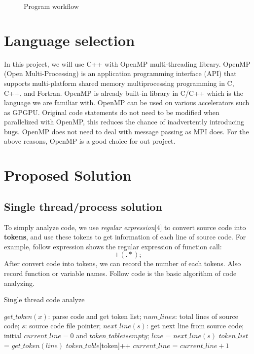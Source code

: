 \documentclass{acm_proc_article-sp}
\begin{document}
\begin{figure}
	\centering
	\caption{Program workflow}
\end{figure}

\section{Language selection}
	In this project, we will use C++ with OpenMP multi-threading library.
	OpenMP (Open Multi-Processing) is an application programming interface 
	(API) that supports multi-platform shared memory multiprocessing 
	programming in C, C++, and Fortran. OpenMP is already built-in library in 
	C/C++ which is the language we are familiar with. OpenMP can be used on 
	various accelerators such as GPGPU. Original code statements do not 
	need to be modified when parallelized with OpenMP, this reduces the chance 
	of inadvertently introducing bugs. OpenMP does not need to deal with message 
	passing as MPI does. For the above reasons, OpenMP is a good choice for 
	out project.
	
\section{Proposed Solution}
\subsection{Single thread/process solution}
	To simply analyze code, we use \textit{regular expression}[4] to convert source
	code into \textbf{tokens}, and use these tokens to get information of each line
	of source code. For example, follow expression shows the regular expression of function call: 
	\begin{displaymath}
		[a-zA-Z_][a-zA-Z0-9_]+(.*);
	\end{displaymath}
	After convert code into tokens, we can record the number of each tokens. Also
	record function or variable names.
	Follow code is the basic algorithm of code analyzing.
	\begin{algorithm}[h]
		\caption{Single thread code analyze}
		\begin{algorithmic}[1]
			\Require
				$get\_token(x)$: parse code and get token list;
				$num\_lines$: total lines of source code;
				$s$: source code file pointer;
				$next\_line(s)$: get next line from source code;
			\State initial $current\_line=0$ and $token\_table is empty$;
				\State $line$ = $next\_line(s)$
				\State $token\_list$ = $get\_token(line)$
					\State $token\_table[$token]++
				\EndFor
				\State $current\_line$ = $current\_line + 1$
			\EndWhile
		\end{algorithmic}
	\end{algorithm}
\end{document}
